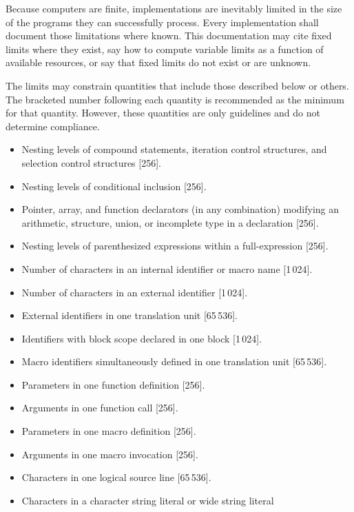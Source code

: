
\begin{paras}

\pnum
Because computers are finite, \Cpp  implementations are inevitably
limited in the size of the programs they can successfully process.
Every implementation shall
document those limitations where known.
This documentation may cite fixed limits where they
exist, say how to compute variable limits as a function
of available resources, or say that fixed limits do not exist
or are unknown.

\pnum
The limits may constrain quantities
that include those described below or others.
The bracketed number following each quantity is recommended
as the minimum for that quantity.
However, these quantities are only guidelines and do not determine compliance.
\begin{itemize}
\item%
Nesting levels of compound statements,
iteration control structures,
and selection control structures [256].
\item%
Nesting levels of conditional inclusion [256].
\item%
Pointer, array, and function declarators
(in any combination)
modifying an arithmetic, structure, union,
or incomplete type in a declaration [256].
\item%
Nesting levels of parenthesized expressions within a full-expression [256].
\item%
Number of
characters in an internal identifier
or macro name [1\,024].
\item%
Number of
characters in an external identifier [1\,024].
\item%
External identifiers in one translation unit [65\,536].
\item%
Identifiers with block scope declared in one block [1\,024].
\item%
Macro identifiers simultaneously defined in one
translation
unit [65\,536].
\item%
Parameters in one function definition [256].
\item%
Arguments in one function call [256].
\item%
Parameters in one macro definition [256].
\item%
Arguments in one macro invocation [256].
\item%
Characters in one logical source line [65\,536].
\item%
Characters in a character string literal or wide string literal

\end{itemize}
\end{paras}

